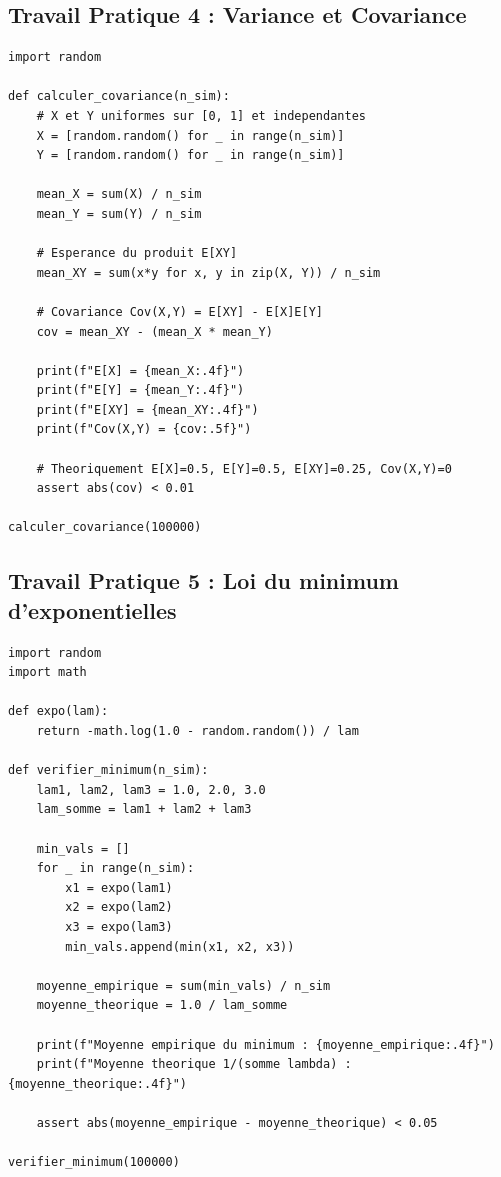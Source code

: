 \documentclass[11pt,a4paper]{article}
\begin{document}
\subsection*{Travail Pratique 4 : Variance et Covariance}

\begin{lstlisting}
import random

def calculer_covariance(n_sim):
    # X et Y uniformes sur [0, 1] et independantes
    X = [random.random() for _ in range(n_sim)]
    Y = [random.random() for _ in range(n_sim)]

    mean_X = sum(X) / n_sim
    mean_Y = sum(Y) / n_sim

    # Esperance du produit E[XY]
    mean_XY = sum(x*y for x, y in zip(X, Y)) / n_sim

    # Covariance Cov(X,Y) = E[XY] - E[X]E[Y]
    cov = mean_XY - (mean_X * mean_Y)

    print(f"E[X] = {mean_X:.4f}")
    print(f"E[Y] = {mean_Y:.4f}")
    print(f"E[XY] = {mean_XY:.4f}")
    print(f"Cov(X,Y) = {cov:.5f}")

    # Theoriquement E[X]=0.5, E[Y]=0.5, E[XY]=0.25, Cov(X,Y)=0
    assert abs(cov) < 0.01

calculer_covariance(100000)
\end{lstlisting}


\subsection*{Travail Pratique 5 : Loi du minimum d'exponentielles}

\begin{lstlisting}
import random
import math

def expo(lam):
    return -math.log(1.0 - random.random()) / lam

def verifier_minimum(n_sim):
    lam1, lam2, lam3 = 1.0, 2.0, 3.0
    lam_somme = lam1 + lam2 + lam3

    min_vals = []
    for _ in range(n_sim):
        x1 = expo(lam1)
        x2 = expo(lam2)
        x3 = expo(lam3)
        min_vals.append(min(x1, x2, x3))

    moyenne_empirique = sum(min_vals) / n_sim
    moyenne_theorique = 1.0 / lam_somme

    print(f"Moyenne empirique du minimum : {moyenne_empirique:.4f}")
    print(f"Moyenne theorique 1/(somme lambda) : {moyenne_theorique:.4f}")

    assert abs(moyenne_empirique - moyenne_theorique) < 0.05

verifier_minimum(100000)
\end{lstlisting}
\end{document}
